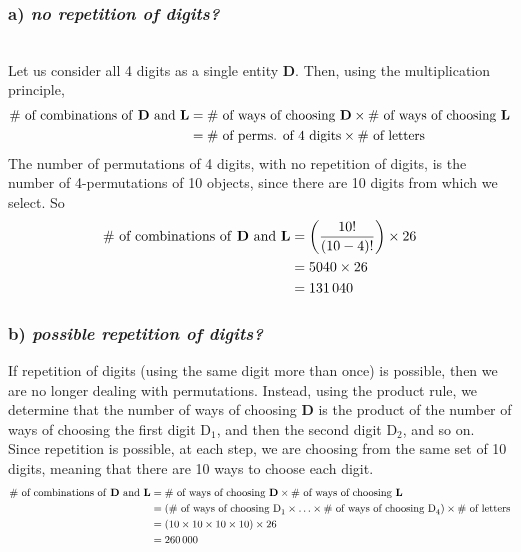 \documentclass{article}
\begin{document}
\subsubsection*{a) {\em no repetition of digits?}}
\\[1ex]
Let us consider all 4 digits as a single entity \textbf{D}. Then, using the multiplication principle,
\begin{align*}
\text{\# of combinations of \textbf{D} and \textbf{L}}& =\text{\# of ways of choosing \textbf{D}}\times\text{\# of ways of choosing \textbf{L}}\\
& =\text{\# of perms. of 4 digits}\times\text{\# of letters}
\end{align*}
The number of permutations of 4 digits, with no repetition of digits, is the number of 4-permutations of 10 objects, since there are 10 digits from which we select. So
\begin{align*}
\text{\# of combinations of \textbf{D} and \textbf{L}}& =\left(\dfrac{10!}{(10-4)!}\right)\times 26\\
& =5040\times 26\\
& =131\,040
\end{align*}

\subsubsection*{b) {\em possible repetition of digits?}}
If repetition of digits (using the same digit more than once) is possible, then we are no longer dealing with permutations. Instead, using the product rule, we determine that the number of ways of choosing \textbf{D} is the product of the number of ways of choosing the first digit D$_1$, and then the second digit D$_2$, and so on.\\[1ex]
Since repetition is possible, at each step, we are choosing from the same set of 10 digits, meaning that there are 10 ways to choose each digit.
\begin{align*}
\text{\# of combinations of \textbf{D} and \textbf{L}}& =\text{\# of ways of choosing \textbf{D}}\times\text{\# of ways of choosing \textbf{L}}\\
& =\left(\text{\# of ways of choosing D}_1\times\ldots\times\text{\# of ways of choosing D}_4\right)\times\text{\# of letters}\\
& =\left(10\times 10\times 10\times 10\right)\times 26\\
& =260\,000
\end{align*}
\end{document}
